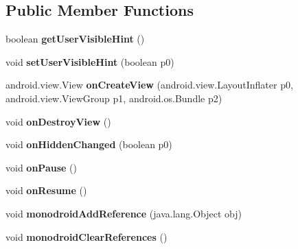 \subsection*{Public Member Functions}
\begin{DoxyCompactItemize}
\item 
\mbox{\label{classmd5270abb39e60627f0f200893b490a1ade_1_1FragmentContainer_a12e358ed77c28754294edfcfb9521d82}} 
boolean {\bfseries get\+User\+Visible\+Hint} ()
\item 
\mbox{\label{classmd5270abb39e60627f0f200893b490a1ade_1_1FragmentContainer_af6e299d60e20e44f0e949f3497fd345b}} 
void {\bfseries set\+User\+Visible\+Hint} (boolean p0)
\item 
\mbox{\label{classmd5270abb39e60627f0f200893b490a1ade_1_1FragmentContainer_a38270e68e1d2d7f70373ca9c82a31f3f}} 
android.\+view.\+View {\bfseries on\+Create\+View} (android.\+view.\+Layout\+Inflater p0, android.\+view.\+View\+Group p1, android.\+os.\+Bundle p2)
\item 
\mbox{\label{classmd5270abb39e60627f0f200893b490a1ade_1_1FragmentContainer_a4d7e667cd11efc3b3a5cb5d2e17dda1d}} 
void {\bfseries on\+Destroy\+View} ()
\item 
\mbox{\label{classmd5270abb39e60627f0f200893b490a1ade_1_1FragmentContainer_a51729a9d69add152b7b1e0f6270db36c}} 
void {\bfseries on\+Hidden\+Changed} (boolean p0)
\item 
\mbox{\label{classmd5270abb39e60627f0f200893b490a1ade_1_1FragmentContainer_ad857beb53f208f2c494e78fec52c61e3}} 
void {\bfseries on\+Pause} ()
\item 
\mbox{\label{classmd5270abb39e60627f0f200893b490a1ade_1_1FragmentContainer_af6db9cb141d90e44e3cc57d33a3e7ce3}} 
void {\bfseries on\+Resume} ()
\item 
\mbox{\label{classmd5270abb39e60627f0f200893b490a1ade_1_1FragmentContainer_aa20e0e8c51af1976fdfbfe10e351fb04}} 
void {\bfseries monodroid\+Add\+Reference} (java.\+lang.\+Object obj)
\item 
\mbox{\label{classmd5270abb39e60627f0f200893b490a1ade_1_1FragmentContainer_aedf1e2fba19c8c5c3ab497d9ef62e0cd}} 
void {\bfseries monodroid\+Clear\+References} ()
\end{DoxyCompactItemize}
